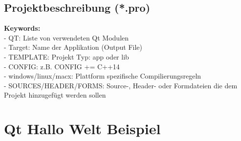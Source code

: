 \subsection{Projektbeschreibung (*.pro)}
\begin{multicols}{2}
\textbf{Keywords:} \\
- QT: Liste von verwendeten Qt Modulen \\
- Target: Name der Applikation (Output File) \\
- TEMPLATE: Projekt Typ: app oder lib \\
- CONFIG: z.B. CONFIG += C++14  \\
- windows/linux/macx: Plattform spezifische   Compilierungsregeln \\
- SOURCES/HEADER/FORMS: Source-, Header- oder Formdateien die dem Projekt hinzugefügt werden sollen \\
\columnbreak
{}
\end{multicols}


\section{Qt Hallo Welt Beispiel}


